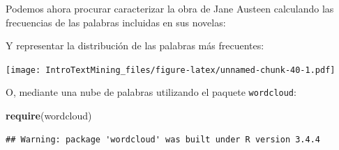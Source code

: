 \documentclass[]{article}
\newenvironment{Shaded}{\begin{snugshade}}{\end{snugshade}}
\newcommand{\KeywordTok}[1]{\textcolor[rgb]{0.13,0.29,0.53}{\textbf{#1}}}
\newcommand{\DataTypeTok}[1]{\textcolor[rgb]{0.13,0.29,0.53}{#1}}
\newcommand{\DecValTok}[1]{\textcolor[rgb]{0.00,0.00,0.81}{#1}}
\newcommand{\FloatTok}[1]{\textcolor[rgb]{0.00,0.00,0.81}{#1}}
\newcommand{\StringTok}[1]{\textcolor[rgb]{0.31,0.60,0.02}{#1}}
\newcommand{\OtherTok}[1]{\textcolor[rgb]{0.56,0.35,0.01}{#1}}
\newcommand{\OperatorTok}[1]{\textcolor[rgb]{0.81,0.36,0.00}{\textbf{#1}}}
\newcommand{\NormalTok}[1]{#1}
\begin{document}
Podemos ahora procurar caracterizar la obra de Jane Austeen calculando
las frecuencias de las palabras incluidas en sus novelas:

\begin{Shaded}
\end{Shaded}

Y representar la distribución de las palabras más frecuentes:

\begin{Shaded}
\end{Shaded}

\texttt{[image: IntroTextMining\_files/figure-latex/unnamed-chunk-40-1.pdf]}

O, mediante una nube de palabras utilizando el paquete
\texttt{wordcloud}:

\begin{Shaded}
\begin{Highlighting}[]
\KeywordTok{require}\NormalTok{(wordcloud)}
\end{Highlighting}
\end{Shaded}

\begin{verbatim}
## Warning: package 'wordcloud' was built under R version 3.4.4
\end{verbatim}

\begin{Shaded}
\end{Shaded}
\end{document}
